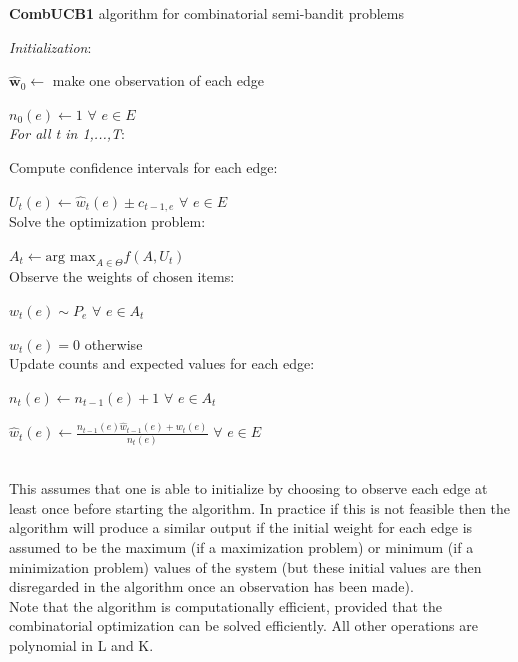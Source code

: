 \noindent \hrulefill

\noindent \textbf{CombUCB1} algorithm for combinatorial semi-bandit problems

\noindent \hrulefill

\noindent \textit{Initialization}:

$\mathbf{\hat{w}}_0 \leftarrow$ make one observation of each edge

$n_0(e) \leftarrow 1$ $\forall$ $e \in E$\\

\noindent \textit{For all t in 1,...,T}:

Compute confidence intervals for each edge:

\indent \indent $U_t(e) \leftarrow \hat{w}_t(e)\pm c_{t-1,e}$ $\forall$ $e \in E$\\

Solve the optimization problem:

\indent \indent $A_t \leftarrow \textrm{arg max}_{A\in \Theta}f(A,U_t)$\\

Observe the weights of chosen items:

\indent \indent $w_t(e) \sim P_e$ $\forall$ $e \in A_t$

\indent \indent $w_t(e)=0$ otherwise\\

Update counts and expected values for each edge:

\indent \indent $n_t(e) \leftarrow n_{t-1}(e) + 1$ $\forall$ $e \in A_t$

\indent \indent $\hat{w}_t(e) \leftarrow \frac{n_{t-1}(e)\hat{w}_{t-1}(e)+w_t(e)}{n_t(e)}$ $\forall$ $e \in E$

\noindent \hrulefill\\

This assumes that one is able to initialize by choosing to observe each edge at least once before starting the algorithm. In practice if this is not feasible then the algorithm will produce a similar output if the initial weight for each edge is assumed to be the maximum (if a maximization problem) or minimum (if a minimization problem) values of the system (but these initial values are then disregarded in the algorithm once an observation has been made).\\

Note that the algorithm is computationally efficient, provided that the combinatorial optimization can be solved efficiently. All other operations are polynomial in L and K.\\

